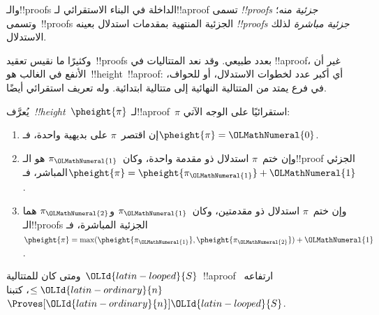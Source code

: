 \documentclass[../../../include/open-logic-section]{subfiles}
\begin{document}
والـ!!{proof}s الداخلة في البناء الاستقرائي لـ!!a{proof} تسمى
\emph{!!{proof}s جزئية} منه؛ وتسمى~!!{proof}s الجزئية المنتهية بمقدمات استدلال بعينه
\emph{!!{proof}s جزئية مباشرة} لذلك الاستدلال.

وكثيرًا ما نقيس تعقيد~!!{proof}s بعدد طبيعي. وقد نعد المتتاليات في
!!a{proof}، غير أن الأنفع في الغالب هو~!!{height}~!!a{proof}: أي أكبر
عدد لخطوات الاستدلال، أو للحواف، في فرع يمتد من المتتالية النهائية إلى
متتالية ابتدائية. وله تعريف استقرائي أيضًا.

\begin{defn}
يُعرَّف~\emph{!!{height}}~$\pheight{\pi}$ لـ!!a{proof}~$\pi$ استقرائيًا
على الوجه الآتي:
\begin{enumerate}
  \item إن اقتصر~$\pi$ على بديهية واحدة، فـ$\pheight{\pi}=\OLMathNumeral{0}$.
  \item وإن ختم~$\pi$ استدلال ذو مقدمة واحدة، وكان~$\pi_\OLMathNumeral{1}$ هو
  الـ!!{proof} الجزئي المباشر، فـ$\pheight{\pi}=\pheight{\pi_\OLMathNumeral{1}}+\OLMathNumeral{1}$.
  \item وإن ختم~$\pi$ استدلال ذو مقدمتين، وكان~$\pi_\OLMathNumeral{1}$ و$\pi_\OLMathNumeral{2}$
  هما الـ!!{proof}s الجزئية المباشرة، فـ
  $\pheight{\pi}=\max(\pheight{\pi_\OLMathNumeral{1}},\pheight{\pi_\OLMathNumeral{2}})+\OLMathNumeral{1}$.
\end{enumerate}
ومتى كان للمتتالية~$\OLId{latin-looped}{S}$~!!a{proof} ارتفاعه~$\le \OLId{latin-ordinary}{n}$، كتبنا~$\Proves[\OLId{latin-ordinary}{n}]\OLId{latin-looped}{S}$.
\end{defn}
\end{document}
